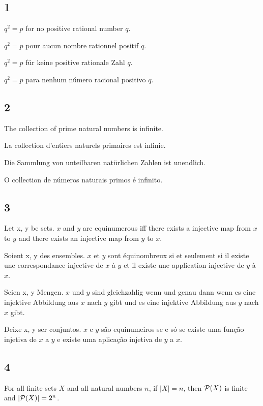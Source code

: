 \documentclass{article}
\newcommand{\pow}{{\cal P}}
\begin{document}
\subsection*{1}

$ q^{2} = p $ for no positive rational number $ q $.

$ q^{2} = p $ pour aucun nombre rationnel positif $ q $.

$ q^{2} = p $ für keine positive rationale Zahl $ q $.

$ q^{2} = p $ para nenhum número racional positivo $ q $.

\subsection*{2}

The collection of prime natural numbers is infinite.

La collection d'entiers naturels primaires est infinie.

Die Sammlung von unteilbaren natürlichen Zahlen ist unendlich.

O collection de números naturais primos é infinito.

\subsection*{3}

Let x, y be sets. $ x $ and $ y $ are equinumerous iff there exists a injective map from $ x $ to $ y $ and there exists an injective map from $ y $ to $ x $.

Soient x, y des ensembles. $ x $ et $ y $ sont équinombreux si et seulement si il existe une correspondance injective de $ x $ à $ y $ et il existe une application injective de $ y $ à $ x $.

Seien x, y Mengen. $ x $ und $ y $ sind gleichzahlig wenn und genau dann wenn es eine injektive Abbildung aus $ x $ nach $ y $ gibt und es eine injektive Abbildung aus $ y $ nach $ x $ gibt.

Deixe x, y ser conjuntos. $ x $ e $ y $ são equinumeiros se e só se existe uma função injetiva de $ x $ a $ y $ e existe uma aplicação injetiva de $ y $ a $ x $.

\subsection*{4}

For all finite sets $ X $ and all natural numbers $ n $, if $ |X| = n $, then $ \pow(X) $ is finite and $ |\pow(X)| = 2^{n} $.
\end{document}
